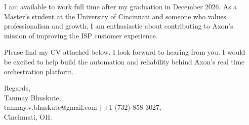 \documentclass[11pt]{letter}
\begin{document}
\begin{letter}{}
I am available to work full time after my graduation in December 2026. As a Master's student at the University of Cincinnati and someone who values professionalism and growth, I am enthusiastic about contributing to Axon's mission of improving the ISP customer experience.

Please find my CV attached below. I look forward to hearing from you. I would be excited to help build the automation and reliability behind Axon's real time orchestration platform.

{\setlength{\parskip}{0pt}
Regards,\\
Tanmay Bhuskute,\\
tanmay.v.bhuskute@gmail.com $\mid$ +1 (732) 858-3027,\\
Cincinnati, OH.
}

\end{letter}
\end{document}
